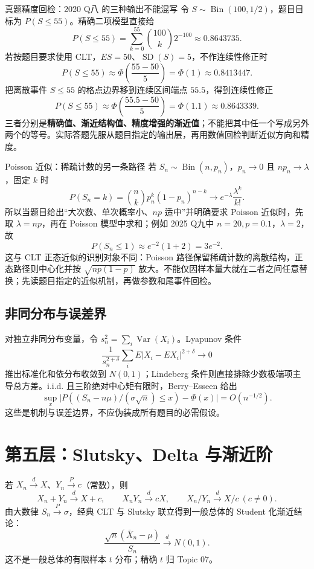 \documentclass[11pt,a4paper]{ctexart}
\newcommand{\kw}[1]{\textbf{\color{deep}#1}}
\begin{document}
\begin{examplebox}{真题精度回检：2020 Q八 的三种输出不能混写}
令 $S\sim\operatorname{Bin}(100,1/2)$，题目目标为 $P(S\le55)$。精确二项模型直接给
\[
P(S\le55)=\sum_{k=0}^{55}\binom{100}{k}2^{-100}\approx0.8643735.
\]
若按题目要求使用 CLT，$ES=50$、$\operatorname{SD}(S)=5$，不作连续性修正时
\[
P(S\le55)\approx\Phi\left(\frac{55-50}{5}\right)=\Phi(1)\approx0.8413447.
\]
把离散事件 $S\le55$ 的格点边界移到连续区间端点 $55.5$，得到连续性修正
\[
P(S\le55)\approx\Phi\left(\frac{55.5-50}{5}\right)=\Phi(1.1)\approx0.8643339.
\]
三者分别是\kw{精确值、渐近结构值、精度增强的渐近值}；不能把其中任一个写成另外两个的等号。实际答题先服从题目指定的输出层，再用数值回检判断近似方向和精度。
\end{examplebox}

\begin{methodbox}{Poisson 近似：稀疏计数的另一条路径}
若 $S_n\sim\operatorname{Bin}(n,p_n)$，$p_n\to0$ 且 $np_n\to\lambda$，固定 $k$ 时
\[
P(S_n=k)=\binom nkp_n^k(1-p_n)^{n-k}
\longrightarrow e^{-\lambda}\frac{\lambda^k}{k!}.
\]
所以当题目给出“大次数、单次概率小、$np$ 适中”并明确要求 Poisson 近似时，先取 $\lambda=np$，再在 Poisson 模型中求和；例如 2025 Q九中 $n=20,p=0.1$，$\lambda=2$，故
\[
P(S_n\le1)\approx e^{-2}\left(1+2\right)=3e^{-2}.
\]
这与 CLT 正态近似的识别对象不同：Poisson 路径保留稀疏计数的离散结构，正态路径则中心化并按 $\sqrt{np(1-p)}$ 放大。不能仅因样本量大就在二者之间任意替换；先读题目指定的近似机制，再做参数和尾事件回检。
\end{methodbox}

\subsection{非同分布与误差界}

对独立非同分布变量，令 $s_n^2=\sum_i\operatorname{Var}(X_i)$。Lyapunov 条件
\[
\frac1{s_n^{2+\delta}}\sum_iE\lvert X_i-EX_i\rvert^{2+\delta}\to0
\]
推出标准化和依分布收敛到 $N(0,1)$；Lindeberg 条件则直接排除少数极端项主导总方差。i.i.d. 且三阶绝对中心矩有限时，Berry--Esseen 给出
\[
\sup_x\lvert P((S_n-n\mu)/(\sigma\sqrt n)\le x)-\Phi(x)\rvert=O(n^{-1/2}).
\]
这些是机制与误差边界，不应伪装成所有题目的必需假设。

\section{第五层：Slutsky、Delta 与渐近阶}

若 $X_n\xrightarrow{d}X$、$Y_n\xrightarrow{P}c$（常数），则
\[
X_n+Y_n\xrightarrow{d}X+c,\qquad X_nY_n\xrightarrow{d}cX,
\qquad X_n/Y_n\xrightarrow{d}X/c\ (c\ne0).
\]
由大数律 $S_n\xrightarrow{P}\sigma$，经典 CLT 与 Slutsky 联立得到一般总体的 Student 化渐近结论：
\[
\frac{\sqrt n(\bar X_n-\mu)}{S_n}\xrightarrow{d}N(0,1).
\]
这不是一般总体的有限样本 $t$ 分布；精确 $t$ 归 Topic 07。
\end{document}
